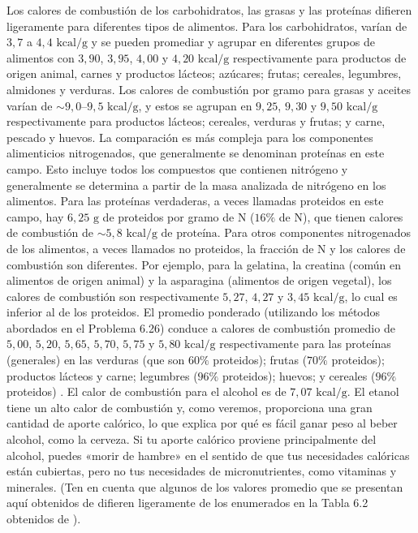 \documentclass[12pt]{book}
\begin{document}
Los calores de combustión de los carbohidratos, las grasas y las proteínas difieren ligeramente para diferentes tipos de alimentos. Para los carbohidratos, varían de $3,7$ a $4,4\text{ kcal/g}$ y se pueden promediar y agrupar en diferentes grupos de alimentos con $3,90$, $3,95$, $4,00$ y $4,20\text{ kcal/g}$ respectivamente para productos de origen animal, carnes y productos lácteos; azúcares; frutas; cereales, legumbres, almidones y verduras. Los calores de combustión por gramo para grasas y aceites varían de $\sim 9,0\text{--}9,5\text{ kcal/g}$, y estos se agrupan en $9,25$, $9,30$ y $9,50\text{ kcal/g}$ respectivamente para productos lácteos; cereales, verduras y frutas; y carne, pescado y huevos. La comparación es más compleja para los componentes alimenticios nitrogenados, que generalmente se denominan proteínas en este campo. Esto incluye todos los compuestos que contienen nitrógeno y generalmente se determina a partir de la masa analizada de nitrógeno en los alimentos. Para las proteínas verdaderas, a veces llamadas proteidos en este campo, hay $6,25\text{ g}$ de proteidos por gramo de $\text{N}$ ($16\%$ de $\text{N}$), que tienen calores de combustión de $\sim 5,8\text{ kcal/g de proteína}$. Para otros componentes nitrogenados de los alimentos, a veces llamados no proteidos, la fracción de $\text{N}$ y los calores de combustión son diferentes. Por ejemplo, para la gelatina, la creatina (común en alimentos de origen animal) y la asparagina (alimentos de origen vegetal), los calores de combustión son respectivamente $5,27$, $4,27$ y $3,45\text{ kcal/g}$, lo cual es inferior al de los proteidos. El promedio ponderado (utilizando los métodos abordados en el Problema 6.26) conduce a calores de combustión promedio de $5,00$, $5,20$, $5,65$, $5,70$, $5,75$ y $5,80\text{ kcal/g}$ respectivamente para las proteínas (generales) en las verduras (que son $60\%$ proteidos); frutas ($70\%$ proteidos); productos lácteos y carne; legumbres ($96\%$ proteidos); huevos; y cereales ($96\%$ proteidos) \cite{68}. El calor de combustión para el alcohol es de $7,07\text{ kcal/g}$. El etanol tiene un alto calor de combustión y, como veremos, proporciona una gran cantidad de aporte calórico, lo que explica por qué es fácil ganar peso al beber alcohol, como la cerveza. Si tu aporte calórico proviene principalmente del alcohol, puedes «morir de hambre» en el sentido de que tus necesidades calóricas están cubiertas, pero no tus necesidades de micronutrientes, como vitaminas y minerales. (Ten en cuenta que algunos de los valores promedio que se presentan aquí obtenidos de \cite{68} difieren ligeramente de los enumerados en la Tabla 6.2 obtenidos de \cite{35}).
\end{document}

